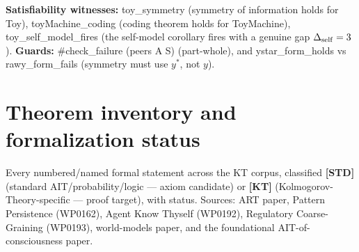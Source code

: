 \documentclass[11pt,a4paper]{article}
\newcommand{\lean}[1]{{\ttfamily\small
  \let\leanunderscore\_\def\_{\leanunderscore\allowbreak}#1}}
\begin{document}
\noindent\textbf{Satisfiability witnesses:} \lean{toy\_symmetry} (symmetry of information holds for
\lean{Toy}), \lean{toyMachine\_coding} (coding theorem holds for \lean{ToyMachine}),
\lean{toy\_self\_model\_fires} (the self-model corollary fires with a genuine gap
$\Delta_{\rm self}=3$). \textbf{Guards:} \lean{\#check\_failure (peers A S)} (part-whole), and
\lean{ystar\_form\_holds} vs \lean{rawy\_form\_fails} (symmetry must use $y^\ast$, not $y$).

\section{Theorem inventory and formalization status}
\label{sec:inventory}

Every numbered/named formal statement across the KT corpus, classified
\textbf{[STD]} (standard AIT/probability/logic --- axiom candidate) or \textbf{[KT]}
(Kolmogorov-Theory-specific --- proof target), with status. Sources:
ART paper,\cite{ruffini2026art} Pattern Persistence (WP0162),\cite{ruffini2026persistence}
Agent Know Thyself (WP0192), Regulatory Coarse-Graining (WP0193), world-models
paper,\cite{ruffini2025worldmodels} and the foundational AIT-of-consciousness paper.\cite{ruffini2017algorithmic}
\end{document}
